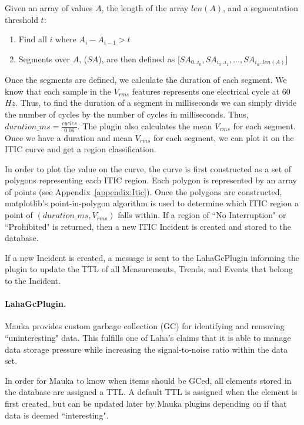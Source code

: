 Given an array of values $A$, the length of the array $len(A)$, and a segmentation threshold $t$:
\begin{enumerate}
	\item Find all $i$ where $A_i - A_{i-1} > t$
	\item Segments over $A$, ($SA$), are then defined as [$SA_{0..i_0}, SA_{i_0..i_1}, \dots, SA_{i_n..len(A)}$]
\end{enumerate}

Once the segments are defined, we calculate the duration of each segment. We know that each sample in the $V_{rms}$ features represents one electrical cycle at 60$Hz$. Thus, to find the duration of a segment in milliseconds we can simply divide the number of cycles by the number of cycles in milliseconds. Thus, $duration\_ms = \frac{cycles}{0.06}$. The plugin also calculates the mean $V_{rms}$ for each segment. Once we have a duration and mean $V_{rms}$ for each segment, we can plot it on the ITIC curve and get a region classification.

In order to plot the value on the curve, the curve is first constructed as a set of polygons representing each ITIC region. Each polygon is represented by an array of points (see Appendix~\ref{appendix:Itic}). Once the polygons are constructed, matplotlib's point-in-polygon algorithm is used to determine which ITIC region a point of $(duration\_ms, V_{rms})$ falls within. If a region of ``No Interruption" or ``Prohibited" is returned, then a new ITIC Incident is created and stored to the database.

If a new Incident is created, a message is sent to the LahaGcPlugin informing the plugin to update the TTL of all Measurements, Trends, and Events that belong to the Incident.

\paragraph{LahaGcPlugin.}\label{sec:gc_plugin}
Mauka provides custom garbage collection (GC) for identifying and removing ``uninteresting" data. This fulfills one of Laha's claims that it is able to manage data storage pressure while increasing the signal-to-noise ratio within the data set.

In order for Mauka to know when items should be GCed, all elements stored in the database are assigned a TTL. A default TTL is assigned when the element is first created, but can be updated later by Mauka plugins depending on if that data is deemed ``interesting".


